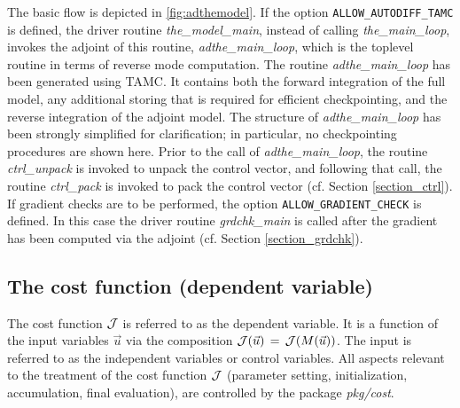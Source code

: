 The basic flow is depicted in \ref{fig:adthemodel}.
If the option {\tt ALLOW\_AUTODIFF\_TAMC} is defined, the driver routine
{\it the\_model\_main}, instead of calling {\it the\_main\_loop},
invokes the adjoint of this routine, {\it adthe\_main\_loop},
which is the toplevel routine in terms of reverse mode computation.
The routine {\it adthe\_main\_loop} has been generated using TAMC.
It contains both the forward integration of the full model, 
any additional storing that is required for efficient checkpointing, 
and the reverse integration of the adjoint model.
The structure of {\it adthe\_main\_loop} has been strongly
simplified for clarification; in particular, no checkpointing
procedures are shown here.
Prior to the call of {\it adthe\_main\_loop}, the routine
{\it ctrl\_unpack} is invoked to unpack the control vector,
and following that call, the routine {\it ctrl\_pack}
is invoked to pack the control vector
(cf. Section \ref{section_ctrl}).
If gradient checks are to be performed, the option 
{\tt ALLOW\_GRADIENT\_CHECK} is defined. In this case
the driver routine {\it grdchk\_main} is called after
the gradient has been computed via the adjoint
(cf. Section \ref{section_grdchk}).

\subsection{The cost function (dependent variable)
\label{section_cost}}

The cost function $ {\cal J} $ is referred to as the {\sf dependent variable}.
It is a function of the input variables $ \vec{u} $ via the composition
$ {\cal J}(\vec{u}) \, = \, {\cal J}(M(\vec{u})) $. 
The input is referred to as the
{\sf independent variables} or {\sf control variables}.
All aspects relevant to the treatment of the cost function $ {\cal J} $
(parameter setting, initialization, accumulation, 
final evaluation), are controlled by the package {\it pkg/cost}.



